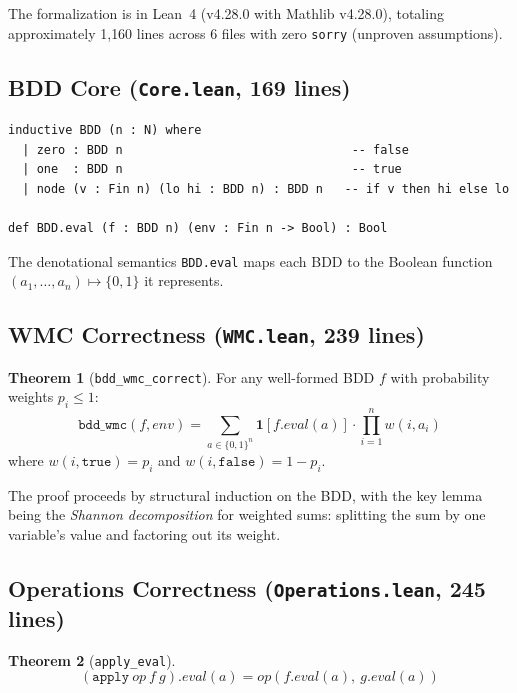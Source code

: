 \documentclass[11pt,a4paper]{article}
\theoremstyle{definition}
\newtheorem{theorem}{Theorem}[section]
\begin{document}
The formalization is in Lean~4 (v4.28.0 with Mathlib v4.28.0), totaling
approximately 1{,}160 lines across 6 files with zero \texttt{sorry}
(unproven assumptions).

\subsection{BDD Core (\texttt{Core.lean}, 169 lines)}

\begin{lstlisting}[language={}]
inductive BDD (n : N) where
  | zero : BDD n                                -- false
  | one  : BDD n                                -- true
  | node (v : Fin n) (lo hi : BDD n) : BDD n   -- if v then hi else lo

def BDD.eval (f : BDD n) (env : Fin n -> Bool) : Bool
\end{lstlisting}

The denotational semantics \texttt{BDD.eval} maps each BDD to the Boolean
function $(a_1,\ldots,a_n) \mapsto \{0,1\}$ it represents.

\subsection{WMC Correctness (\texttt{WMC.lean}, 239 lines)}

\begin{theorem}[\texttt{bdd\_wmc\_correct}]
For any well-formed BDD $f$ with probability weights $p_i \leq 1$:
\[
\texttt{bdd\_wmc}(f, \mathit{env}) = \sum_{a \in \{0,1\}^n} \mathbf{1}[f.\mathit{eval}(a)] \cdot \prod_{i=1}^n w(i, a_i)
\]
where $w(i, \texttt{true}) = p_i$ and $w(i, \texttt{false}) = 1 - p_i$.
\end{theorem}

The proof proceeds by structural induction on the BDD, with the key lemma
being the \emph{Shannon decomposition} for weighted sums: splitting the sum
by one variable's value and factoring out its weight.

\subsection{Operations Correctness (\texttt{Operations.lean}, 245 lines)}

\begin{theorem}[\texttt{apply\_eval}]
\[
(\texttt{apply}\ \mathit{op}\ f\ g).\mathit{eval}(a) = \mathit{op}(f.\mathit{eval}(a),\ g.\mathit{eval}(a))
\]
\end{theorem}
\end{document}
